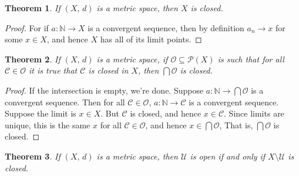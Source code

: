 \documentclass{article}
\theoremstyle{plain}
\newtheorem{theorem}{Theorem}[section]
\theoremstyle{normal}
\begin{document}
        \begin{theorem}
            If $(X,\,d)$ is a metric space, then $X$ is closed.
        \end{theorem}
        \begin{proof}
            For if $a:\mathbb{N}\rightarrow{X}$ is a convergent sequence,
            then by definition $a_{n}\rightarrow{x}$ for some $x\in{X}$,
            and hence $X$ has all of its limit points.
        \end{proof}
        \begin{theorem}
            If $(X,\,d)$ is a metric space, if
            $\mathcal{O}\subseteq\mathcal{P}(X)$ is such that for all
            $\mathcal{C}\in\mathcal{O}$ it is true that $\mathcal{C}$ is closed
            in $X$, then $\bigcap\mathcal{O}$ is closed.
        \end{theorem}
        \begin{proof}
            If the intersection is empty, we're done. Suppose
            $a:\mathbb{N}\rightarrow\bigcap\mathcal{O}$ is a convergent
            sequence. Then for all $\mathcal{C}\in\mathcal{O}$,
            $a:\mathbb{N}\rightarrow\mathcal{C}$ is a convergent sequence.
            Suppose the limit is $x\in{X}$. But $\mathcal{C}$ is closed, and
            hence $x\in\mathcal{C}$. Since limits are unique, this is the
            same $x$ for all $\mathcal{C}\in\mathcal{O}$, and hence
            $x\in\bigcap\mathcal{O}$, That is, $\bigcap\mathcal{O}$ is closed.
        \end{proof}
        \begin{theorem}
            If $(X,\,d)$ is a metric space, then
            $\mathcal{U}$ is open if and only if $X\setminus\mathcal{U}$ is
            closed.
        \end{theorem}
\end{document}
